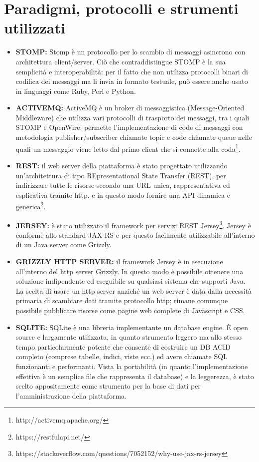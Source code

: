 \section{Paradigmi, protocolli e strumenti utilizzati}

\begin{itemize}
	\item \textbf{STOMP:} Stomp è un protocollo per lo scambio di messaggi asincrono con architettura client/server.
	Ciò che contraddistingue STOMP è la sua semplicità e interoperabilità: per il fatto che non utilizza
	protocolli binari di codifica dei messaggi ma li invia in formato testuale, può essere anche usato in
	linguaggi come Ruby, Perl e Python.
	\item \textbf{ACTIVEMQ:} ActiveMQ è un broker di messaggistica (Message-Oriented Middleware) che utilizza vari protocolli di trasporto dei messaggi, tra i quali STOMP e OpenWire; permette l’implementazione di code di messaggi con metodologia publisher/subscriber chiamate topic e code chiamate queue nelle quali un messaggio viene letto dal primo client che si connette alla coda\footnote{http://activemq.apache.org/}.
	\item \textbf{REST:} il web server della piattaforma è stato progettato utilizzando un’architettura di tipo REpresentational State Transfer (REST), per indirizzare tutte le risorse secondo una URL unica, rappresentativa ed esplicativa tramite http, e in questo modo fornire una API dinamica e generica\footnote{https://restfulapi.net/}.
	\item \textbf{JERSEY:} è stato utilizzato il framework per servizi REST Jersey\footnote{https://stackoverflow.com/questions/7052152/why-use-jax-rs-jersey}. Jersey è conforme allo standard JAX-RS e per questo facilmente utilizzabile all'interno di un Java server come Grizzly.
	\item \textbf{GRIZZLY HTTP SERVER:} il framework Jersey è in esecuzione all’interno del http server Grizzly. In questo modo è possibile ottenere una soluzione indipendente ed eseguibile su qualsiasi sistema che supporti Java. La scelta di usare un http server anziché un web server è data dalla necessità primaria di scambiare dati tramite protocollo http; rimane comunque possibile pubblicare risorse come pagine web complete di Javascript e CSS.
	\item \textbf{SQLITE:} SQLite è una libreria implementante un database engine. È open source e largamente utilizzata, in quanto strumento leggero ma allo stesso tempo particolarmente potente che consente di costruire un DB ACID completo (comprese tabelle, indici, viste ecc.) ed avere chiamate SQL funzionanti e performanti. Vista la portabilità (in quanto l’implementazione effettiva è un semplice file che rappresenta il database) e la leggerezza, è stato scelto appositamente come strumento per la base di dati per l’amministrazione della piattaforma.

\end{itemize}
